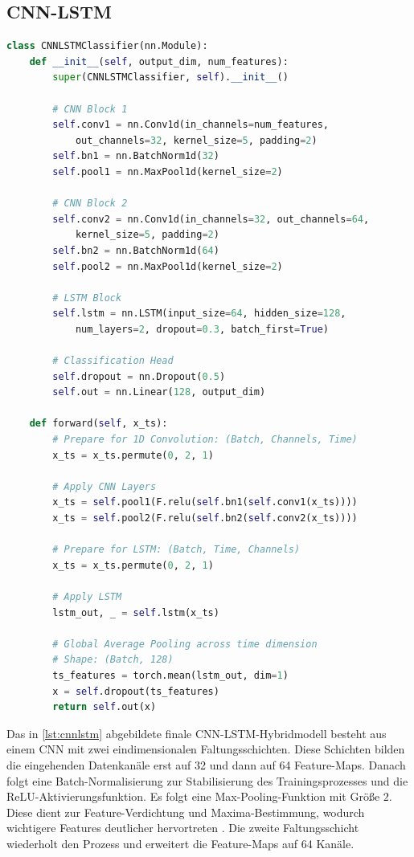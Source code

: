 \subsection{CNN-LSTM}
\begin{lstlisting}[language=Python, caption={PyTorch-Implementierung der hybriden CNN-LSTM Architektur}, label={lst:cnnlstm}]
class CNNLSTMClassifier(nn.Module):
    def __init__(self, output_dim, num_features):
        super(CNNLSTMClassifier, self).__init__()

        # CNN Block 1
        self.conv1 = nn.Conv1d(in_channels=num_features, 
            out_channels=32, kernel_size=5, padding=2)
        self.bn1 = nn.BatchNorm1d(32)
        self.pool1 = nn.MaxPool1d(kernel_size=2)

        # CNN Block 2
        self.conv2 = nn.Conv1d(in_channels=32, out_channels=64, 
            kernel_size=5, padding=2)
        self.bn2 = nn.BatchNorm1d(64)
        self.pool2 = nn.MaxPool1d(kernel_size=2)

        # LSTM Block
        self.lstm = nn.LSTM(input_size=64, hidden_size=128, 
            num_layers=2, dropout=0.3, batch_first=True)

        # Classification Head
        self.dropout = nn.Dropout(0.5)
        self.out = nn.Linear(128, output_dim)

    def forward(self, x_ts):
        # Prepare for 1D Convolution: (Batch, Channels, Time)
        x_ts = x_ts.permute(0, 2, 1)

        # Apply CNN Layers
        x_ts = self.pool1(F.relu(self.bn1(self.conv1(x_ts))))
        x_ts = self.pool2(F.relu(self.bn2(self.conv2(x_ts))))

        # Prepare for LSTM: (Batch, Time, Channels)
        x_ts = x_ts.permute(0, 2, 1)

        # Apply LSTM
        lstm_out, _ = self.lstm(x_ts)
        
        # Global Average Pooling across time dimension
        # Shape: (Batch, 128)
        ts_features = torch.mean(lstm_out, dim=1)
        x = self.dropout(ts_features)
        return self.out(x)
\end{lstlisting}

Das in \ref{lst:cnnlstm} abgebildete finale CNN-LSTM-Hybridmodell besteht aus einem CNN mit zwei eindimensionalen Faltungsschichten. Diese Schichten bilden die eingehenden Datenkanäle erst auf 32 und dann auf 64 Feature-Maps. Danach folgt eine Batch-Normalisierung zur Stabilisierung des Trainingsprozesses und die ReLU-Aktivierungsfunktion. Es folgt eine Max-Pooling-Funktion mit Größe $2$. Diese dient zur Feature-Verdichtung und Maxima-Bestimmung, wodurch wichtigere Features deutlicher hervortreten \cite{Chollet2025}. Die zweite Faltungsschicht wiederholt den Prozess und erweitert die Feature-Maps auf 64 Kanäle.

